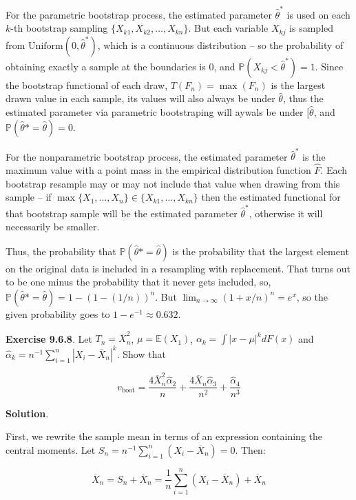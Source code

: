 For the parametric bootstrap process, the estimated parameter
\(\hat{\theta}^*\) is used on each \(k\)-th bootstrap sampling
\(\{ X_{k1}, X_{k2}, \dots, X_{kn} \}\). But each variable \(X_{kj}\) is
sampled from \(\text{Uniform}(0, \hat{\theta}^*)\), which is a
continuous distribution -- so the probability of obtaining exactly a
sample at the boundaries is 0, and
\(\mathbb{P}(X_{kj} < \hat{\theta}^*) = 1\). Since the bootstrap
functional of each draw, \(T(F_n) = \max(F_n)\) is the largest drawn
value in each sample, its values will also always be under
\(\hat{\theta}\), thus the estimated parameter via parametric
bootstraping will aywals be under \([\hat{\theta}\), and
\(\mathbb{P}(\hat{\theta}* = \hat{\theta}) = 0\).

For the nonparametric bootstrap process, the estimated parameter
\(\hat{\theta}^*\) is the maximum value with a point mass in the
empirical distribution function \(\hat{F}\). Each bootstrap resample may
or may not include that value when drawing from this sample -- if
\(\max\{X_1, \dots, X_n\} \in \{X_{k1}, \dots, X_{kn} \}\) then the
estimated functional for that bootstrap sample will be the estimated
parameter \(\hat{\theta}^*\), otherwise it will necessarily be smaller.

Thus, the probability that \(\mathbb{P}(\hat{\theta}* = \hat{\theta})\)
is the probability that the largest element on the original data is
included in a resampling with replacement. That turns out to be one
minus the probability that it never gets included, so,
\(\mathbb{P}(\hat{\theta}* = \hat{\theta}) = 1 - (1 - (1/n))^n\). But
\(\lim_{n \rightarrow \infty } (1 + x/n)^n = e^x\), so the given
probability goes to \(1 - e^{-1} \approx 0.632\).

\textbf{Exercise 9.6.8}. Let \(T_n = \overline{X}_n^2\),
\(\mu = \mathbb{E}(X_1)\), \(\alpha_k = \int |x - \mu|^k dF(x)\) and
\(\hat{\alpha}_k = n^{-1} \sum_{i=1}^n |X_i - \overline{X}_n|^k\). Show
that

\[v_\text{boot} = \frac{4 \overline{X}_n^2 \hat{\alpha}_2}{n} + \frac{4 \overline{X}_n \hat{\alpha}_3}{n^2} + \frac{\hat{\alpha}_4}{n^3}\]

\textbf{Solution}.

First, we rewrite the sample mean in terms of an expression containing
the central moments. Let
\(S_n = n^{-1} \sum_{i=1}^n (X_i - \overline{X}_n) = 0\). Then:

\[ \overline{X}_n = S_n + \overline{X}_n = \frac{1}{n} \sum_{i=1}^n (X_i - \overline{X}_n) + \overline{X}_n \]

